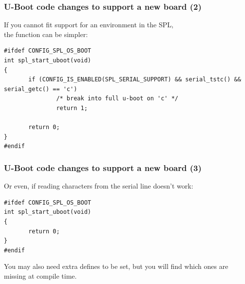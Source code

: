 \begin{frame}[fragile]
\frametitle{U-Boot code changes to support a new board (2)}
If you cannot fit support for an environment in the SPL,\\
the  function can be simpler:
\begin{block}{}
\begin{verbatim}
#ifdef CONFIG_SPL_OS_BOOT
int spl_start_uboot(void)
{
       if (CONFIG_IS_ENABLED(SPL_SERIAL_SUPPORT) && serial_tstc() && serial_getc() == 'c')
               /* break into full u-boot on 'c' */
               return 1;

       return 0;
}
#endif
\end{verbatim}
\end{block}
\end{frame}

\begin{frame}[fragile]
\frametitle{U-Boot code changes to support a new board (3)}
Or even, if reading characters from the serial line doesn't work:
\begin{block}{}
\begin{verbatim}
#ifdef CONFIG_SPL_OS_BOOT
int spl_start_uboot(void)
{
       return 0;
}
#endif
\end{verbatim}
\end{block}
You may also need extra defines to be set, but you will find
which ones are missing at compile time.
\end{frame}

